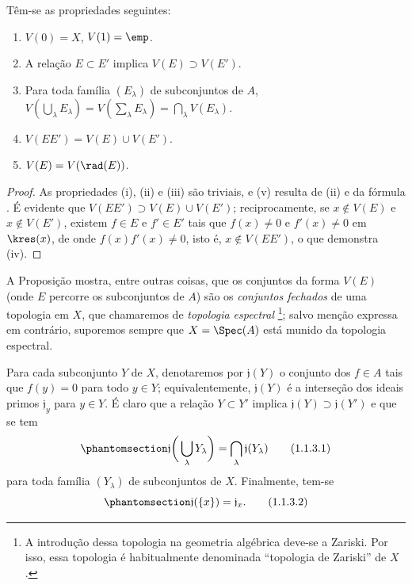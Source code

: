 \documentclass[oneside]{amsart}
\newcommand{\oldpage}[2][]{{\marginnote{\normalfont\textbf{#1}~|~#2}}\ignorespaces}
\let\EGAOriginalLabel\label
\renewcommand{\label}[1]{\phantomsection\EGAOriginalLabel{#1}}
\begin{document}
\begin{proposition}[1.1.2]
\label{I.1.1.2}
Têm-se as propriedades seguintes:
\begin{enumerate}
  \item[{\rm(i)}] $V(0)=X$, $V(1)=\emp$.
  \item[{\rm(ii)}] A relação $E\subset E'$ implica $V(E)\supset V(E')$.
  \item[{\rm(iii)}] Para toda família $(E_\lambda)$ de subconjuntos de $A$, $V(\bigcup_\lambda E_\lambda)=V(\sum_\lambda E_\lambda)=\bigcap_\lambda V(E_\lambda)$.
  \item[{\rm(iv)}] $V(EE')=V(E)\cup V(E')$.
  \item[{\rm(v)}] $V(E)=V(\rad(E))$.
\end{enumerate}
\end{proposition}

\begin{proof}
As propriedades (i), (ii) e (iii) são triviais, e (v) resulta de (ii) e da fórmula .
É evidente que $V(EE')\supset V(E)\cup V(E')$;
reciprocamente, se $x\not\in V(E)$ e $x\not\in V(E')$, existem $f\in E$ e $f'\in E'$ tais que $f(x)\neq 0$ e $f'(x)\neq 0$ em $\kres(x)$, de onde $f(x)f'(x)\neq 0$, isto é, $x\not\in V(EE')$, o que demonstra (iv).
\end{proof}

A Proposição  mostra, entre outras coisas, que os conjuntos da forma $V(E)$ (onde $E$ percorre os subconjuntos de $A$) são os \emph{conjuntos fechados} de uma topologia em $X$, que chamaremos de \emph{topologia espectral}
\footnote{A introdução dessa topologia na geometria algébrica deve-se a Zariski.
Por isso, essa topologia é habitualmente denominada ``topologia de Zariski'' de $X$.};
salvo menção expressa em contrário, suporemos sempre que $X=\Spec(A)$ está munido da topologia espectral.

\begin{env}[1.1.3]
\label{I.1.1.3}
\oldpage[I]{81}
Para cada subconjunto $Y$ de $X$, denotaremos por $\mathfrak{j}(Y)$ o conjunto dos $f\in A$ tais que $f(y)=0$ para todo $y\in Y$;
equivalentemente, $\mathfrak{j}(Y)$ é a interseção dos ideais primos $\mathfrak{j}_y$ para $y\in Y$.
É claro que a relação $Y\subset Y'$ implica $\mathfrak{j}(Y)\supset\mathfrak{j}(Y')$ e que se tem
\[
  \label{I.1.1.3.1}
  \mathfrak{j}\bigg(\bigcup_\lambda Y_\lambda\bigg)=\bigcap_\lambda\mathfrak{j}(Y_\lambda)
  \tag{1.1.3.1}
\]
para toda família $(Y_\lambda)$ de subconjuntos de $X$.
Finalmente, tem-se
\[
  \label{I.1.1.3.2}
  \mathfrak{j}(\{x\})=\mathfrak{j}_x.
  \tag{1.1.3.2}
\]
\end{env}
\end{document}

